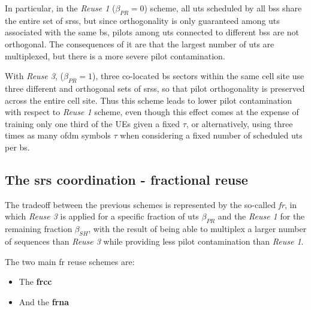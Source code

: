 \documentclass[11pt]{book}
\begin{document}
In particular, in the \textit{Reuse 1} ($\beta_{PR} = 0$) scheme, all \gls{ut}s scheduled by all \gls{bs}s share the entire set of \gls{srs}s, but since orthogonality is only guaranteed among \gls{ut}s associated with the same \gls{bs}, pilots among \gls{ut}s connected to different \gls{bs}s are not orthogonal. The consequences of it are that the largest number of \gls{ut}s are multiplexed, but there is a more severe
pilot contamination.

With \textit{Reuse 3}, ($\beta_{PR} = 1$), three co-located \gls{bs} sectors within the same cell site use three different and orthogonal sets of \gls{srs}s, so that pilot orthogonality is preserved across the entire cell site. Thus this scheme leads to lower pilot contamination with respect to \textit{Reuse 1} scheme, even though this effect comes at the expense of training only one third of the UEs given a fixed $\tau$, or alternatively, using three times as many \gls{ofdm} symbols $\tau$ when considering a fixed number of scheduled \gls{ut}s per \gls{bs}.

\subsection{The \gls{srs} coordination - fractional reuse}
The tradeoff between the previous schemes is represented by the so-called \textit{\gls{fr}}, in which \textit{Reuse 3} is applied for a specific fraction of \gls{ut}s $\beta_{PR}$ and the \textit{Reuse 1} for the remaining fraction$\beta_{SH}$, with the result of being able to multiplex a larger number of
sequences than \textit{Reuse 3} while providing less pilot contamination than \textit{Reuse 1}.

The two main \gls{fr} reuse schemes are:
\begin{itemize}
  \item The \textbf{\gls{frcc}}
  \item And the \textbf{\gls{frna}}
\end{itemize}



\end{document}
